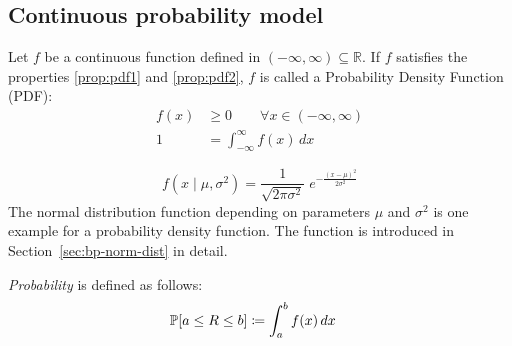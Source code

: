 \subsection{Continuous probability model}
\label{sec:bp-continuous}
%
Let $f$ be a continuous function defined in $(-\infty, \infty) \subseteq \mathbb R$.
If $f$ satisfies the properties \ref{prop:pdf1} and \ref{prop:pdf2}, $f$ is called a Probability Density Function (PDF):
\begin{align}
  f(x) &\geq 0 \qquad \forall x \in (-\infty, \infty) \label{prop:pdf1} \\
     1 &= \int_{-\infty}^{\infty} f(x) \, dx \label{prop:pdf2}
\end{align}
\begin{example}
  \[ f(x \; | \; \mu, \sigma^2) = \frac{1}{\sqrt{2\pi\sigma^2} } \; e^{ -\frac{(x-\mu)^2}{2\sigma^2} } \]
  The normal distribution function depending on parameters $\mu$ and $\sigma^2$ is one example for a probability density function.
  The function is introduced in Section~\ref{sec:bp-norm-dist} in detail.
\end{example}
%
\emph{Probability} is defined as follows:
\begin{align}
  \mathbb P[a \leq R \leq b] &\coloneqq \int_a^b f(x) \, dx
\end{align}

